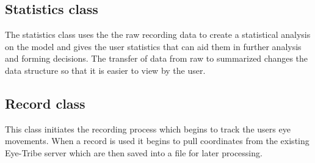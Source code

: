 \subsection{Statistics class}
The statistics class uses the the raw recording data to create a statistical analysis on the model and gives the user statistics that can aid them in further analysis and forming decisions. The transfer of data from raw to summarized changes the data structure so that it is easier to view by the user.

\subsection{Record class}
This class initiates the recording process which begins to track the users eye movements. When a record is used it begins to pull coordinates from the existing Eye-Tribe server which are then saved into a file for later processing.